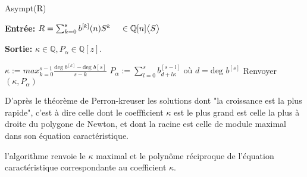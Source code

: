 \documentclass[a4paper,10.5pt]{article}
\begin{document}
	\begin{algorithm}
		\caption{Asympt(R)}
		
		\vspace{2mm}
		
		\textbf{Entrée:} $R=\sum_{k=0}^{s} b^{[k]}(n)S^{k} \hspace{4mm} \in \mathbb{Q}[n]\big<S\big>$
		
		\textbf{Sortie:} $\kappa \in \mathbb{Q}, P_{\alpha} \in \mathbb{Q}[z].$
		
		\begin{algorithmic}[1]
			\vspace{4mm}
			\STATE $\kappa:= max_{k=0}^{s-1}\frac{\text{deg } b^{[k]}-\text{deg } b{[s]}}{s-k}$
			\vspace{4mm}
			\STATE $P_{\alpha}:=\sum_{l=0}^{s} b_{d+l\kappa}^{[s-l]}\text{ où } d=\text{deg } b^{[s]}$
			\vspace{4mm}
			\STATE Renvoyer $(\kappa,P_{\alpha})$
		\end{algorithmic}
		
	\end{algorithm}
	
	\noindent D'après le théorème de Perron-kreuser les solutions dont "la croissance est la plus rapide", c'est à dire celle dont le coeffficient $\kappa$ est le plus grand est celle la plus à droite du polygone de Newton, et dont la racine est celle de module maximal dans son équation caractéristique.
	
	l'algorithme renvoie le $\kappa$ maximal et le polynôme réciproque de l'équation caractéristique correspondante au coefficient $\kappa$.
	
\end{document}
